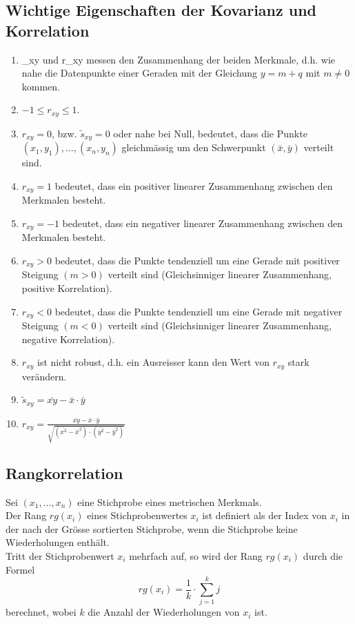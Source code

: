 \subsection{Wichtige Eigenschaften der Kovarianz und Korrelation}
\label{sec:desk_statistik_kovarianz_korrelation}
\begin{enumerate}
    \item {}_{xy} und r_{xy} messen den Zusammenhang der beiden Merkmale, 
        d.h. wie nahe die  Datenpunkte einer Geraden mit der Gleichung $y = m + q$ mit $m \neq 0$ kommen.
    \item $-1 \leq r_{xy} \leq 1$.
    \item $r_{xy} = 0$, bzw. $\tilde{s}_{xy} = 0$ oder nahe bei Null, bedeutet, 
        dass die Punkte $(x_1, y_1), \dots, (x_n,y_n)$ gleichmässig um den Schwerpunkt 
        $(\bar{x}, \bar{y})$ verteilt sind.
    \item $r_{xy} = 1$ bedeutet, dass ein positiver linearer Zusammenhang zwischen den Merkmalen besteht.
    \item $r_{xy} = -1$ bedeutet, dass ein negativer linearer Zusammenhang zwischen den Merkmalen besteht.
    \item $r_{xy} > 0$ bedeutet, dass die Punkte tendenziell um eine Gerade mit positiver Steigung 
        $(m > 0)$ verteilt sind (Gleichsinniger linearer Zusammenhang, positive Korrelation).
    \item $r_{xy} < 0$ bedeutet, dass die Punkte tendenziell um eine Gerade mit negativer Steigung
        $(m < 0)$ verteilt sind (Gleichsinniger linearer Zusammenhang, negative Korrelation).
    \item $r_{xy}$ ist nicht robust, d.h. ein Ausreisser kann den Wert von $r_{xy}$ stark verändern.
    \item $\tilde{s}_{xy} = \bar{xy} - \bar{x} \cdot \bar{y}$
    \item $r_{xy} = \frac{\bar{xy} - \bar{x} \cdot \bar{y}}{\sqrt{(\bar{x^2} - \bar{x}^2) \cdot (\bar{y^2} - \bar{y}^2)}}$
\end{enumerate}

\subsection{Rangkorrelation}
\label{sec:desk_statistik_rangkorrelation}
Sei $(x_1, \dots, x_n)$ eine Stichprobe eines metrischen Merkmals. \\
Der Rang $rg(x_i)$ eines Stichprobenwertes $x_i$ ist definiert als der Index von $x_i$ 
in der nach der Grösse sortierten Stichprobe, wenn die Stichprobe keine Wiederholungen enthält. \\
Tritt der Stichprobenwert $x_i$ mehrfach auf, so wird der Rang $rg(x_i)$ durch die Formel
\begin{equation*}
    rg(x_i) = \frac{1}{k} \cdot \sum_{j=1}^k j
\end{equation*}
berechnet, wobei $k$ die Anzahl der Wiederholungen von $x_i$ ist. \\

